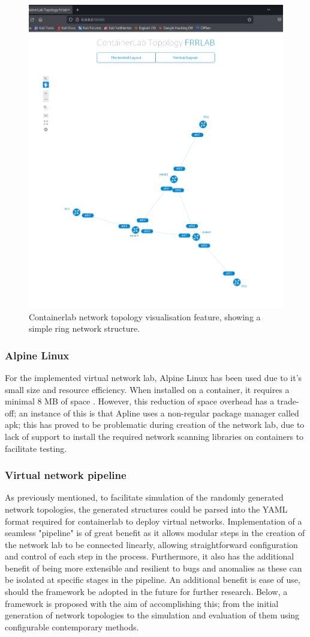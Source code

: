 \begin{figure}
    \centering
    \includegraphics[width=0.5\linewidth]{images/ring_containerlab.png}
    \caption{Containerlab network topology visualisation feature, showing a simple ring network structure.}
    \label{fig:ring_container}
\end{figure}

\subsubsection{Alpine Linux}
For the implemented virtual network lab, Alpine Linux has been used due to it's small size and resource efficiency. When installed on a container, it  requires a minimal 8 MB of space \cite{alpine}. However, this reduction of space overhead has a trade-off; an instance of this is that Apline uses a non-regular package manager called apk; this has proved to be problematic during creation of the network lab, due to lack of support to install the required network scanning libraries on containers to facilitate testing. 

\subsubsection{Virtual network pipeline}
As previously mentioned, to facilitate simulation of the randomly generated network topologies, the generated structures could be parsed into the YAML format required for containerlab to deploy virtual networks. Implementation of a seamless "pipeline" is of great benefit as it allows modular steps in the creation of the network lab to be connected linearly, allowing straightforward configuration and control of each step in the process. Furthermore, it also has the additional benefit of being more extensible and resilient to bugs and anomalies as these can be isolated at specific stages in the pipeline. An additional benefit is ease of use, should the framework be adopted in the future for further research. Below, a framework is proposed with the aim of accomplishing this; from the initial generation of network topologies to the simulation and evaluation of them using configurable contemporary methods. 

